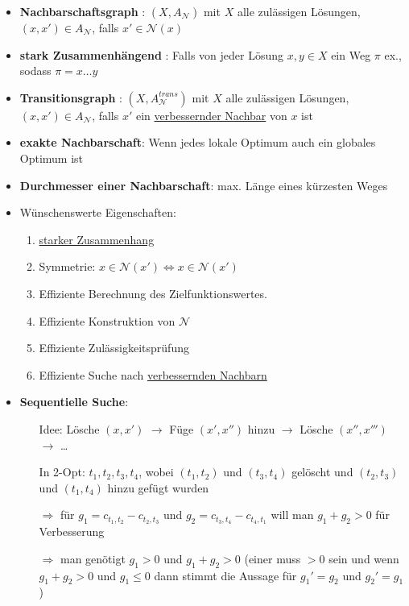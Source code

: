 \documentclass[12pt]{article}
\begin{document}
\begin{itemize}
			\item \textbf{Nachbarschaftsgraph} \label{Nachbarschaftgraph}: $(X,A_\mathcal{N})$ mit $X$ alle zulässigen Lösungen, $(x,x')\in A_\mathcal{N}$, falls $x'\in\mathcal{N}(x)$
			\item \textbf{stark Zusammenhängend} \label{starker Zusammenhang}: Falls von jeder Lösung $x,y\in X$ ein Weg $\pi$ ex., sodass $\pi= x\dots y$
			\item \textbf{Transitionsgraph} \label{Transitionsgraph}: $(X,A_\mathcal{N}^{trans})$ mit $X$ alle zulässigen Lösungen, $(x,x')\in A_\mathcal{N}$, falls $x'$ ein \hyperref[verbessernder Nachbar]{verbessernder Nachbar} von $x$ ist
			\item \textbf{exakte Nachbarschaft}\label{exakte Nachbarschaft}: Wenn jedes lokale Optimum auch ein globales Optimum ist
			\item \textbf{Durchmesser einer Nachbarschaft}\label{Durchmesser}: max. Länge eines kürzesten Weges
			\item Wünschenswerte Eigenschaften:
				\begin{enumerate}
					\item \hyperref[starker Zusammenhang]{starker Zusammenhang}
					\item Symmetrie: $x\in\mathcal{N}(x') \Leftrightarrow x\in\mathcal{N}(x')$
					\item Effiziente Berechnung des Zielfunktionswertes.
					\item Effiziente Konstruktion von $\mathcal{N}$
					\item Effiziente Zulässigkeitsprüfung
					\item Effiziente Suche nach \hyperref[verbessernder Nachbar]{verbessernden Nachbarn}
				\end{enumerate}
			\item \textbf{Sequentielle Suche}\label{sequentielle Suche}:
				\begin{itemize}
					\item[Idee:] Lösche $(x,x')$ $\rightarrow$ Füge $(x',x'')$ hinzu $\rightarrow$ Lösche $(x'',x''')$ $\rightarrow$ \dots
					\item[In 2-Opt:] $t_1,t_2,t_3,t_4$, wobei $(t_1,t_2)$ und $(t_3,t_4)$ gelöscht und $(t_2,t_3)$ und $(t_1,t_4)$ hinzu gefügt wurden
					\item[$\Rightarrow$] für $g_1 = c_{t_1,t_2}-c_{t_2,t_3}$ und $g_2= c_{t_3,t_4}-c_{t_4,t_1}$ will man $g_1+g_2 > 0$ für Verbesserung
					\item[$\Rightarrow$] man genötigt $g_1 > 0$ und $g_1+g_2 > 0$ (einer muss $>0$ sein und wenn $g_1+g_2 > 0$ und $g_1\le0$ dann stimmt die Aussage für $g_1'=g_2$ und $g_2'=g_1$)

\end{itemize}
\end{itemize}
\end{document}
